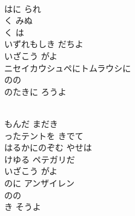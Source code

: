 \documentclass[10pt,b5j]{tarticle} %
\begin{document}
\begin{enumerate}
\begin{minipage}[c]{\blocksize}
    \end{minipage}
    \begin{minipage}[c]{\blocksize}
        
        \vspace{\linespace}
        \item~\\
        はに られ\\
        く みぬ\\
        く は\\
        いずれもしき だちよ\\
        いざこう がよ\\
        ニセイカウシュペにトムラウシに\\
        のの\\
        のたきに ろうよ
        
    \end{minipage}
    \begin{minipage}[c]{\blocksize}
        
        \vspace{\linespace}
        \item~\\
        もんだ まだき\\
        ったテントを きでて\\
        はるかにのぞむ やせは\\
        けゆる ペテガリだ\\
        いざこう がよ\\
        のに アンザイレン\\
        のの\\
        き そうよ
    
    \end{minipage}
\end{enumerate} %
\end{document}
